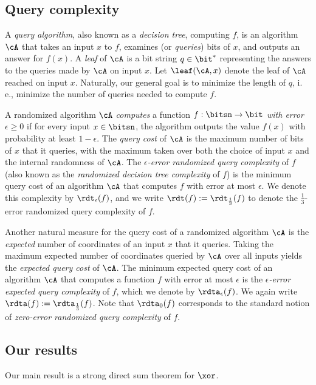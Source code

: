 \documentclass[11pt]{article}
\numberwithin{equation}{section}
\theoremstyle{definition}
\theoremstyle{plain}
\newcommand{\ie}{i.\,e.}
\begin{document}
%
\subsection{Query complexity}  %
%
A \emph{query algorithm},  %
also known as a \emph{decision tree},  %
computing $f$, is an algorithm $\cA$ that takes %
an input $x$ to $f$, examines (or \emph{queries}) bits of $x$, and
outputs an answer for $f(x)$.  A \emph{leaf} of $\cA$ is a bit string
$q \in \bit^*$ representing the answers to the queries made by $\cA$
on input $x$.  Let $\leaf(\cA,x)$ denote the leaf of $\cA$ reached on input
$x$.  Naturally, our general goal is to minimize the 
length of $q$, %
\ie, minimize the number of queries needed to compute $f$.

A randomized algorithm $\cA$ \emph{computes} a function
$f : \bitsn \to \bit$ \emph{with error $\epsilon \ge 0$} if for every
input $x \in \bitsn$, the algorithm outputs the value $f(x)$ with
probability at least $1-\epsilon$.  The \emph{query cost} of $\cA$ is
the maximum number of bits of $x$ that it queries, with the
maximum taken over both the choice of input $x$ and the internal
randomness of $\cA$.  The \emph{$\epsilon$-error %
  randomized query complexity} of $f$ (also known as the
\emph{randomized decision tree complexity} of $f$) is the minimum
query cost of an algorithm $\cA$ that computes $f$ with error at
most $\epsilon$. We denote this complexity by $\rdt_\epsilon(f)$, and
we write $\rdt(f) := \rdt_{\frac13}(f)$ to denote the $\frac13$-error
randomized query complexity of $f$.

Another natural measure for the query cost of a randomized algorithm
$\cA$ is the \emph{expected} number of coordinates of an input $x$
that it queries.   %
%
%
%
Taking the maximum expected number of coordinates
queried by $\cA$ over all inputs yields the %
\emph{expected query cost} %
of $\cA$. The minimum %
expected  %
query cost of an algorithm $\cA$
that computes a function $f$ with error at most $\epsilon$ is the
%
\emph{$\epsilon$-error expected query complexity} %
of $f$, which we
denote by $\rdta_{\epsilon}(f)$.   %
%
%
%
We again write $\rdta(f) := \rdta_{\frac 13}(f)$. Note that
$\rdta_0(f)$ corresponds to the standard notion of
\emph{zero-error randomized query complexity} of $f$.
%
%
%
%
%

%
\subsection{Our results}

Our main result is a strong direct sum theorem for $\xor$.
\end{document}
